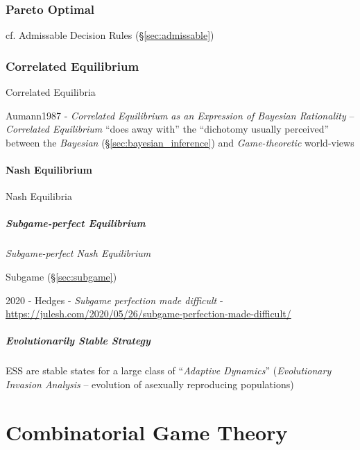 \subsubsection{Pareto Optimal}\label{sec:pareto_optimal}

\fist cf. Admissable Decision Rules (\S\ref{sec:admissable})



\subsubsection{Correlated Equilibrium}\label{sec:correlated_equilibrium}

Correlated Equilibria

Aumann1987 - \emph{Correlated Equilibrium as an Expression of Bayesian
  Rationality} -- \emph{Correlated Equilibrium} ``does away with'' the
``dichotomy usually perceived'' between the \emph{Bayesian}
(\S\ref{sec:bayesian_inference}) and \emph{Game-theoretic} world-views



\paragraph{Nash Equilibrium}\label{sec:nash_equilibrium}\hfill

Nash Equilibria



\subparagraph{Subgame-perfect Equilibrium}\label{sec:subgame_perfect}\hfill

\emph{Subgame-perfect Nash Equilibrium}

Subgame (\S\ref{sec:subgame})

2020 - Hedges - \emph{Subgame perfection made difficult} -
\url{https://julesh.com/2020/05/26/subgame-perfection-made-difficult/}



\subparagraph{Evolutionarily Stable Strategy}
\label{sec:evolutionarily_stable}\hfill

ESS are stable states for a large class of ``\emph{Adaptive Dynamics}''
(\emph{Evolutionary Invasion Analysis} -- evolution of asexually reproducing
populations)




\section{Combinatorial Game Theory}\label{sec:combinatorial_game_theory}

